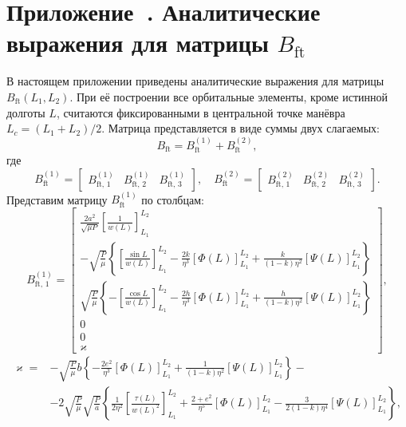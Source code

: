 \section*{Приложение~\thesection. Аналитические выражения для матрицы $B_{\text{ft}}$}

В настоящем приложении приведены аналитические выражения для матрицы $B_{\text{ft}}(L_1, L_2)$. При её построении все орбитальные элементы, кроме истинной долготы 
$L$, считаются фиксированными в центральной точке манёвра $L_c = (L_1 + L_2) / 2$.
Матрица представляется в виде суммы двух слагаемых:
\begin{equation*}
    B_{\text{ft}} = B_{\text{ft}}^{(1)} + B_{\text{ft}}^{(2)},
\end{equation*}
где 
\begin{equation*}
B_{\text{ft}}^{(1)} =
    \begin{bmatrix}
        B_{\text{ft, 1}}^{(1)} &
        B_{\text{ft, 2}}^{(1)} &
        B_{\text{ft, 3}}^{(1)}
    \end{bmatrix},
\quad
B_{\text{ft}}^{(2)} =
    \begin{bmatrix}
        B_{\text{ft, 1}}^{(2)} &
        B_{\text{ft, 2}}^{(2)} &
        B_{\text{ft, 3}}^{(2)}
    \end{bmatrix}.
\end{equation*}
Представим матрицу $B_{\text{ft}}^{(1)}$ по столбцам:
\begin{equation*}
B_{\text{ft, 1}}^{(1)} =
    \begin{bmatrix}
        \frac{2a^{2}}{\sqrt{\mu P}} \left[ \frac{1}{w(L)} \right]_{L_1}^{L_2} \\
        -\sqrt{\frac{P}{\mu}} \left\{ \left[ \frac{\sin L}{w(L)} \right]_{L_1}^{L_2} -
        \frac{2k}{\eta^{3}} \left[ \Phi(L) \right]_{L_1}^{L_2} +
        \frac{k}{(1 - k) \eta^2} \left[ \Psi(L) \right]_{L_1}^{L_2} \right\} \\
        \sqrt{\frac{P}{\mu}} \left\{ -\left[ \frac{\cos L}{w(L)} \right]_{L_1}^{L_2} -
        \frac{2h}{\eta^{3}} \left[ \Phi(L) \right]_{L_1}^{L_2} +
        \frac{h}{(1 - k) \eta^2} \left[ \Psi(L) \right]_{L_1}^{L_2} \right\} \\
        0 \\
        0 \\
        \varkappa
    \end{bmatrix},
\end{equation*}
\begin{align*}
    \varkappa = &-\sqrt{\frac{P}{\mu}} b \left\{ - \frac{2e^2}{\eta^3} \left[ \Phi(L) \right]_{L_1}^{L_2} +
    \frac{1}{(1 - k) \eta^2} \left[ \Psi(L) \right]_{L_1}^{L_2} \right\} - \\
    &-2 \sqrt{\frac{P}{\mu}} \sqrt{\frac{P}{a}} \left\{
    \frac{1}{2 \eta^2} \left[ \frac{\tau(L)}{w(L)^2} \right]_{L_1}^{L_2} +
    \frac{2 + e^2}{\eta^5} \left[ \Phi(L) \right]_{L_1}^{L_2} -
    \frac{3}{2 (1 - k) \eta^4} \left[ \Psi(L) \right]_{L_1}^{L_2}
    \right\},
\end{align*}
